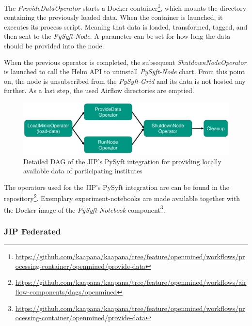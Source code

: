 The \textit{ProvideDataOperator} starts a Docker container\footnote{\url{https://github.com/kaapana/kaapana/tree/feature/openmined/workflows/processing-container/openmined/provide-data}}, which mounts the directory containing the previously loaded data. When the container is launched, it executes its process script. Meaning that data is loaded, transformed, tagged, and then sent to the \textit{PySyft-Node}. A parameter can be set for how long the data should be provided into the node.

When the previous operator is completed, the subsequent \textit{ShutdownNodeOperator} is launched to call the Helm API to uninstall \textit{PySyft-Node} chart.
From this point on, the node is unsubscribed from the \textit{PySyft-Grid} and its data is not hosted any further. As a last step, the used Airflow directories are emptied.

\begin{figure}[htbp!]
    \centerline{\includegraphics[width=1\textwidth]{1_Figures/DAG_PySyft.pdf}}
    \caption[Detailed illustration of DAG for the JIP's PySyft integration]{Detailed DAG of the JIP's PySyft integration for providing locally available data of participating institutes}
\label{fig:DetailedDAG_PySyft}
\end{figure}

The operators used for the JIP's PySyft integration are can be found in the repository\footnote{\url{https://github.com/kaapana/kaapana/tree/feature/openmined/workflows/airflow-components/dags/openmined}}.
Exemplary experiment-notebooks are made available together with the Docker image of the \textit{PySyft-Notebook} component\footnote{\url{https://github.com/kaapana/kaapana/tree/feature/openmined/workflows/processing-container/openmined/provide-data}}.



\subsubsection{JIP Federated}
\label{subsubsec:JIPFederated}

